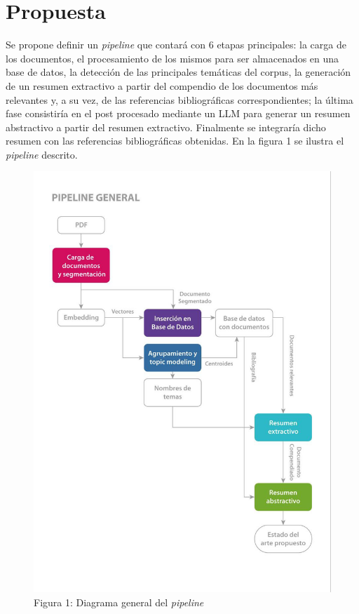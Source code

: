 \chapter{Propuesta}\label{chapter:proposal}
   Se propone definir un \emph{pipeline} que contará con 6 etapas principales: la carga de los documentos, el procesamiento de los mismos para ser almacenados en una base de datos, la detección de las principales temáticas del corpus, la generación de un resumen extractivo a partir del compendio de los documentos más relevantes y, a su vez, de las referencias bibliográficas correspondientes; la última fase consistiría en el post procesado mediante un LLM para generar un resumen abstractivo a partir del resumen extractivo. Finalmente se integraría dicho resumen con las referencias bibliográficas obtenidas. En la figura 1 se ilustra el \emph{pipeline} descrito.

    \begin{figure}[H]    
        \centering
        \includegraphics[scale = 0.25]{Figures/pipeline_general.jpg}
        \caption*{Figura 1: Diagrama general del \emph{pipeline}}
    \end{figure}
    

